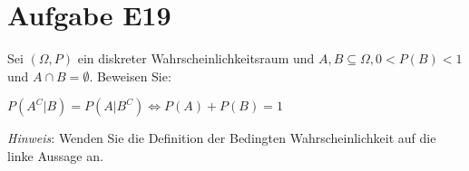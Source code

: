 \section{Aufgabe E19}
Sei $(\Omega, P)$ ein diskreter Wahrscheinlichkeitsraum und $A,B \subseteq \Omega, 0 < P(B) < 1$ und $A \cap B = \emptyset.$ Beweisen Sie:

\begin{center}
$P(A^C | B) = P(A | B^C) \Leftrightarrow P(A) + P(B) = 1$
\end{center}

\noindent \textit{Hinweis}: Wenden Sie die Definition der Bedingten Wahrscheinlichkeit auf die linke Aussage an.

